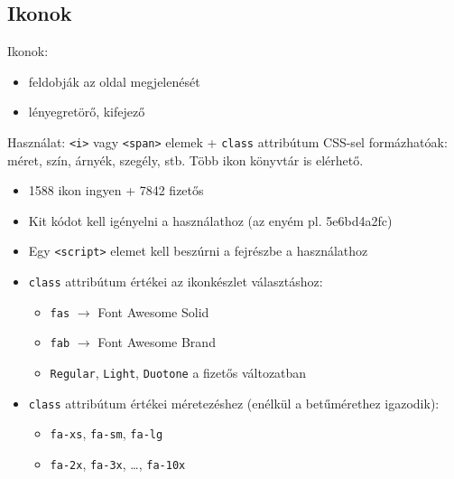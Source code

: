\subsection{Ikonok}

\begin{frame}
  Ikonok:
  \begin{itemize}
    \item feldobják az oldal megjelenését
    \item lényegretörő, kifejező
  \end{itemize}
  \vfill
  Használat: \texttt{<i>} vagy \texttt{<span>} elemek + \texttt{class} attribútum
  \vfill
  CSS-sel formázhatóak: méret, szín, árnyék, szegély, stb.
  \vfill
  Több ikon könyvtár is elérhető.
\end{frame}

\begin{frame}
  \begin{itemize}
    \item 1588 ikon ingyen + 7842 fizetős
    \item Kit kódot kell igényelni a használathoz (az enyém pl. 5e6bd4a2fc)
    \item Egy \texttt{<script>} elemet kell beszúrni a fejrészbe a használathoz
    \item \texttt{class} attribútum értékei az ikonkészlet választáshoz:
    \begin{itemize}
      \item \texttt{fas} $\to$ Font Awesome Solid
      \item \texttt{fab} $\to$ Font Awesome Brand
      \item \texttt{Regular}, \texttt{Light}, \texttt{Duotone} a fizetős változatban
    \end{itemize}
    \item \texttt{class} attribútum értékei méretezéshez (enélkül a betűmérethez igazodik):
    \begin{itemize}
      \item \texttt{fa-xs}, \texttt{fa-sm}, \texttt{fa-lg}
      \item \texttt{fa-2x}, \texttt{fa-3x}, \dots, \texttt{fa-10x}
    \end{itemize}
  \end{itemize}
\end{frame}

